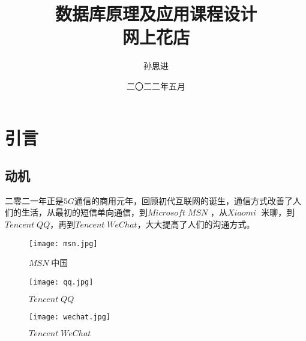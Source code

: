 \documentclass[forprint]{sql}
\begin{document}

\miji{ }                                      %

\title{数据库原理及应用课程设计\\网上花店}
\author{孙思进}                            %
\date{二〇二二年五月}                    %

\maketitle
\frontmatter
{}              %
\tableofcontents
\mainmatter %
\chapter{引言}
\section{动机}
二零二一年正是$ 5G $通信的商用元年，回顾初代互联网的诞生，通信方式改善了人们的生活，从最初的短信单向通信，到$ Microsoft \; MSN$ ，从$ Xiaomi \;$ 米聊，到 $Tencent \; QQ $，再到$Tencent \; WeChat$，大大提高了人们的沟通方式。

\begin{figure}[ht]
	\centering
	\begin{minipage}[t]{0.33\linewidth}
		\centering
		\texttt{[image: msn.jpg]}
		\caption{$MSN \;$中国}
		\label{fig:1}
	\end{minipage}%
	\begin{minipage}[t]{0.33\linewidth}
		\centering
		\texttt{[image: qq.jpg]}
		\caption{$Tencent \; QQ $}
		\label{fig:2}
	\end{minipage}%
	\begin{minipage}[t]{0.33\linewidth}
		\centering
		\texttt{[image: wechat.jpg]}
		\caption{$Tencent \; WeChat $}
		\label{fig:3}
	\end{minipage}%
\end{figure}
\end{document}
